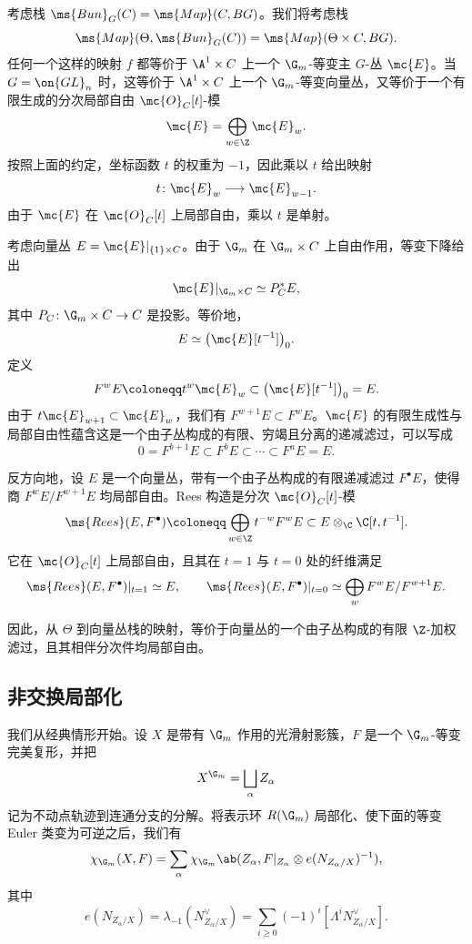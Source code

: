考虑栈 \(\ms{Bun}_G(C) = \ms{Map}(C, BG)\)。我们将考虑栈
\[ \ms{Map}(\Theta, \ms{Bun}_G(C)) = \ms{Map}(\Theta \times C, BG). \]
任何一个这样的映射 \(f\) 都等价于 \(\A^1\times C\) 上一个 \(\G_m\)-等变主 \(G\)-丛 \(\mc{E}\)。当 \(G=\on{GL}_n\) 时，这等价于 \(\A^1\times C\) 上一个 \(\G_m\)-等变向量丛，又等价于一个有限生成的分次局部自由 \(\mc{O}_C[t]\)-模
\[
    \mc{E}=\bigoplus_{w\in\Z}\mc{E}_w.
\]
按照上面的约定，坐标函数 \(t\) 的权重为 \(-1\)，因此乘以 \(t\) 给出映射
\[
    t\colon\mc{E}_w\longrightarrow\mc{E}_{w-1}.
\]
由于 \(\mc{E}\) 在 \(\mc{O}_C[t]\) 上局部自由，乘以 \(t\) 是单射。

\begin{rmk}
    考虑向量丛 \(E=\mc{E}|_{\{1\}\times C}\)。由于 \(\G_m\) 在 \(\G_m\times C\) 上自由作用，等变下降给出
    \[
        \mc{E}|_{\G_m\times C}\simeq P_C^*E,
    \]
    其中 \(P_C\colon\G_m\times C\to C\) 是投影。等价地，
    \[
        E\simeq\big(\mc{E}[t^{-1}]\big)_0.
    \]
    定义
    \[
        F^wE\coloneqq t^w\mc{E}_w\subset\big(\mc{E}[t^{-1}]\big)_0=E.
    \]
    由于 \(t\mc{E}_{w+1}\subset\mc{E}_w\)，我们有 \(F^{w+1}E\subset F^wE\)。\(\mc{E}\) 的有限生成性与局部自由性蕴含这是一个由子丛构成的有限、穷竭且分离的递减滤过，可以写成
    \[
        0=F^{b+1}E\subset F^bE\subset\cdots\subset F^aE=E.
    \]

    反方向地，设 \(E\) 是一个向量丛，带有一个由子丛构成的有限递减滤过 \(F^\bullet E\)，使得商 \(F^wE/F^{w+1}E\) 均局部自由。Rees 构造是分次 \(\mc{O}_C[t]\)-模
    \[
        \ms{Rees}(E,F^\bullet)
        \coloneqq
        \bigoplus_{w\in\Z}t^{-w}F^wE
        \subset
        E\otimes_{\C}\C[t,t^{-1}].
    \]
    它在 \(\mc{O}_C[t]\) 上局部自由，且其在 \(t=1\) 与 \(t=0\) 处的纤维满足
    \[
        \ms{Rees}(E,F^\bullet)|_{t=1}\simeq E,
        \qquad
        \ms{Rees}(E,F^\bullet)|_{t=0}
        \simeq
        \bigoplus_w F^wE/F^{w+1}E.
    \]
\end{rmk}

因此，从 \(\Theta\) 到向量丛栈的映射，等价于向量丛的一个由子丛构成的有限 \(\Z\)-加权滤过，且其相伴分次件均局部自由。


\subsection{非交换局部化}%
\label{sub:Non-abelian localization}

我们从经典情形开始。设 \(X\) 是带有 \(\G_m\) 作用的光滑射影簇，\(F\) 是一个 \(\G_m\)-等变完美复形，并把
\[
    X^{\G_m}=\bigsqcup_\alpha Z_\alpha
\]
记为不动点轨迹到连通分支的分解。将表示环 \(R(\G_m)\) 局部化、使下面的等变 Euler 类变为可逆之后，我们有
\[
    \chi_{\G_m}(X,F)
    =
    \sum_\alpha
    \chi_{\G_m}\ab(
        Z_\alpha,
        F|_{Z_\alpha}\otimes e(N_{Z_\alpha/X})^{-1}
    ),
\]
其中
\[
    e(N_{Z_\alpha/X})
    =
    \lambda_{-1}(N_{Z_\alpha/X}^\vee)
    =
    \sum_{i\geq0}(-1)^i[\Lambda^iN_{Z_\alpha/X}^\vee].
\]

